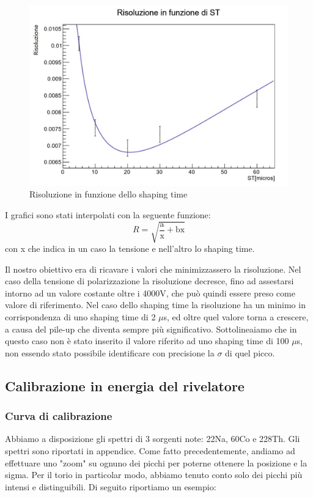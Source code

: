 \documentclass[a4paper,10pt]{article}
\begin{document}
\begin{figure}[h!]
    \centering
    \includegraphics[scale=0.45]{grafici/risoluzionest}
    \caption{Risoluzione in funzione dello shaping time}
\end{figure}

I grafici sono stati interpolati con la seguente funzione: 
\begin{equation}
	R=\sqrt{\frac{\textrm{a}}{\textrm{x}}+\textrm{bx}}
\end{equation}
con x che indica in un caso la tensione e nell'altro lo shaping time.

Il nostro obiettivo era di ricavare i valori che minimizzassero la risoluzione. Nel caso della tensione di polarizzazione la risoluzione decresce, fino ad assestarsi intorno ad un valore costante oltre i 4000V, che può quindi essere preso come valore di riferimento. Nel caso dello shaping time la risoluzione ha un minimo in corrispondenza di uno shaping time di 2 $\mu$s, ed oltre quel valore torna a crescere, a causa del pile-up che diventa sempre più significativo. Sottolineaiamo che in questo caso non è stato inserito il valore riferito ad uno shaping time di 100 $\mu$s, non essendo stato possibile identificare con precisione la $\sigma$ di quel picco.
\subsection{Calibrazione in energia del rivelatore}
\subsubsection{Curva di calibrazione}
Abbiamo a disposizione gli spettri di 3 sorgenti note: 22Na, 60Co e 228Th. Gli spettri sono riportati in appendice. Come fatto precedentemente, andiamo ad effettuare uno "zoom" su ognuno dei picchi per poterne ottenere la posizione e la sigma. Per il torio in particolar modo, abbiamo tenuto conto solo dei picchi più intensi e distinguibili. Di seguito riportiamo un esempio:
\end{document}
